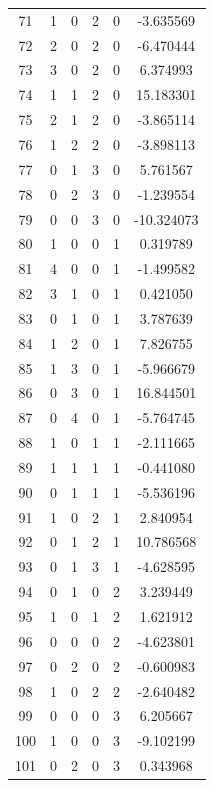 \documentclass[preprint,12pt]{elsarticle}
\begin{document}
\begin{table}[h!]
\begin{minipage}[h!]{0.23\textwidth}
{\begin{tabular}{|c|ccccc|}
71  &   1 &   0 &   2 &   0 &   -3.635569 \\
72  &   2 &   0 &   2 &   0 &   -6.470444 \\
73  &   3 &   0 &   2 &   0 &    6.374993 \\
74  &   1 &   1 &   2 &   0 &   15.183301 \\
75  &   2 &   1 &   2 &   0 &   -3.865114 \\
76  &   1 &   2 &   2 &   0 &   -3.898113 \\
77  &   0 &   1 &   3 &   0 &    5.761567 \\
78  &   0 &   2 &   3 &   0 &   -1.239554 \\
79  &   0 &   0 &   3 &   0 &  -10.324073 \\
80  &   1 &   0 &   0 &   1 &    0.319789 \\
81  &   4 &   0 &   0 &   1 &   -1.499582 \\
82  &   3 &   1 &   0 &   1 &    0.421050 \\
83  &   0 &   1 &   0 &   1 &    3.787639 \\
84  &   1 &   2 &   0 &   1 &    7.826755 \\
85  &   1 &   3 &   0 &   1 &   -5.966679 \\
86  &   0 &   3 &   0 &   1 &   16.844501 \\
87  &   0 &   4 &   0 &   1 &   -5.764745 \\
88  &   1 &   0 &   1 &   1 &   -2.111665 \\
89  &   1 &   1 &   1 &   1 &   -0.441080 \\
90  &   0 &   1 &   1 &   1 &   -5.536196 \\
91  &   1 &   0 &   2 &   1 &    2.840954 \\
92  &   0 &   1 &   2 &   1 &   10.786568 \\
93  &   0 &   1 &   3 &   1 &   -4.628595 \\
94  &   0 &   1 &   0 &   2 &    3.239449 \\
95  &   1 &   0 &   1 &   2 &    1.621912 \\
96  &   0 &   0 &   0 &   2 &   -4.623801 \\
97  &   0 &   2 &   0 &   2 &   -0.600983 \\
98  &   1 &   0 &   2 &   2 &   -2.640482 \\
99  &   0 &   0 &   0 &   3 &    6.205667 \\
100 &   1 &   0 &   0 &   3 &   -9.102199 \\
101 &   0 &   2 &   0 &   3 &    0.343968 \\

\end{tabular}}
\end{minipage}
\end{table}
\end{document}
